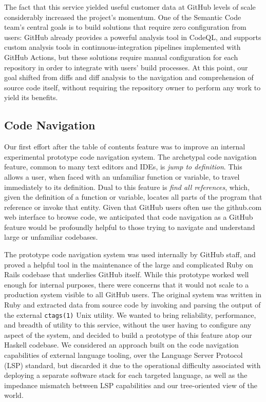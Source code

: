 \documentclass[acmsmall,fleqn]{acmart}
\begin{document}
The fact that this service yielded useful customer data at GitHub levels of
scale considerably increased the project's momentum. One of the Semantic Code
team's central goals is to build solutions that require zero configuration from
users: GitHub already provides a powerful analysis tool in CodeQL, and supports
custom analysis tools in continuous-integration pipelines implemented with
GitHub Actions, but these solutions require manual configuration for each
repository in order to integrate with users' build processes. At this point, our
goal shifted from diffs and diff analysis to the navigation and comprehension of
source code itself, without requiring the repository owner to perform any work
to yield its benefits.

\subsection{Code Navigation}

Our first effort after the table of contents feature was to improve an internal
experimental prototype code navigation system. The archetypal code navigation
feature, common to many text editors and IDEs, is \emph{jump to definition}.
This allows a user, when faced with an unfamiliar function or variable, to
travel immediately to its definition. Dual to this feature is \emph{find all
  references}, which, given the definition of a function or variable, locates
all parts of the program that reference or invoke that entity. Given that GitHub
users often use the \textsf{github.com} web interface to browse code, we
anticipated that code navigation as a GitHub feature would be profoundly helpful
to those trying to navigate and understand large or unfamiliar codebases.

The prototype code navigation system was used internally by GitHub staff, and
proved a helpful tool in the maintenance of the large and complicated Ruby on
Rails codebase that underlies GitHub itself. While this prototype worked well
enough for internal purposes, there were concerns that it would not scale to a
production system visible to all GitHub users. The original system was written
in Ruby and extracted data from source code by invoking and parsing the output
of the external \texttt{ctags(1)} Unix utility. We wanted to bring reliability,
performance, and breadth of utility to this service, without the user having to
configure any aspect of the system, and decided to build a prototype of this
feature atop our Haskell codebase. We considered an approach built on the code
navigation capabilities of external language tooling, over the Language Server
Protocol (LSP) standard, but discarded it due to the operational difficulty
associated with deploying a separate software stack for each targeted language,
as well as the impedance mismatch between LSP capabilities and our tree-oriented
view of the world.
\end{document}
